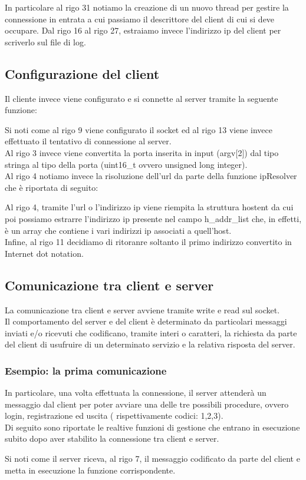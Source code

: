 \documentclass[a4paper]{article}
\begin{document}
In particolare al rigo 31 notiamo la creazione di un nuovo thread per gestire la connessione in entrata a cui passiamo il descrittore del client di cui si deve occupare.
Dal rigo 16 al rigo 27, estraiamo invece l'indirizzo ip del client per scriverlo sul file di log.
\pagebreak
\subsection{Configurazione del client}
Il cliente invece viene configurato e si connette al server tramite la seguente funzione:


Si noti come al rigo 9 viene configurato il socket ed al rigo 13 viene invece effettuato il tentativo di connessione al server.\\
Al rigo 3 invece viene convertita la porta inserita in input (argv$[$2$]$) dal tipo stringa al tipo della porta (uint16\_t ovvero unsigned long integer).\\
Al rigo 4 notiamo invece la risoluzione dell'url da parte della funzione ipResolver che è riportata di seguito:

Al rigo 4, tramite l'url o l'indirizzo ip viene riempita la struttura hostent da cui poi possiamo estrarre l'indirizzo ip presente nel campo 
h\_addr\_list  che, in effetti, è un array che contiene i vari indirizzi ip associati a quell'host.\\
Infine, al rigo 11 decidiamo di ritoranre soltanto il primo indirizzo convertito in Internet dot notation.
\pagebreak
\subsection{Comunicazione tra client e server}
La comunicazione tra client e server avviene tramite write e read sul socket.\\
Il comportamento del server e del client è determinato da particolari messaggi inviati e/o ricevuti che codificano, tramite interi o caratteri, la richiesta da parte del client di usufruire di un determinato servizio e la relativa risposta del server.
 \subsubsection{Esempio: la prima comunicazione}
 In particolare, una volta effettuata la connessione,
il server attenderà un messaggio dal client per poter avviare una delle tre possibili procedure, ovvero login, registrazione ed uscita ( rispettivamente codici: 1,2,3).\\
Di seguito sono riportate le realtive funzioni di gestione che entrano in esecuzione subito dopo aver stabilito la connessione
tra client e server.

Si noti come il server riceva, al rigo 7, il messaggio codificato da parte del client e metta in esecuzione la funzione corrispondente.

\end{document}
